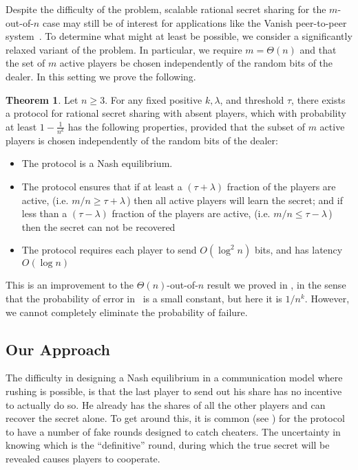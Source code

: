 \documentclass[12pt]{article}
\theoremstyle{definition}
\newtheorem{theorem}{Theorem}
\begin{document}
Despite the difficulty of the problem, scalable rational secret
sharing for the $m$-out-of-$n$ case may still be of interest for
applications like the Vanish peer-to-peer
system~\cite{geambasu2009vanish}.  To determine what might at least be
possible, we consider a significantly relaxed variant of the problem.
In particular, we require $m = \Theta(n)$ and that the set of $m$
active players be chosen independently of the random bits of the
dealer.  In this setting we prove the following.

\begin{theorem}
Let $n \geq 3$.  For any fixed positive $k, \lambda$, and threshold
$\tau$, there exists a protocol for rational secret sharing with
absent players, which with probability at least $1-\frac1{n^k}$ has
the following properties, provided that the subset of $m$ active
players is chosen independently of the random bits of the dealer:
\begin{itemize}
\item The protocol is a Nash equilibrium.
\item The protocol ensures that if at least a $(\tau + \lambda)$
  fraction of the players are active, (i.e. $m/n \ge \tau +
  \lambda$\,) then all active players will learn the secret; and if
  less than a $(\tau - \lambda)$ fraction of the players are active,
  (i.e. $m/n \le \tau -\lambda$\,) then the secret can not be
  recovered
\item The protocol requires each player to send $O(\log^2 n)$ bits,
  and has latency $O(\log n)$
\end{itemize}
\label{thm:mofn}
\end{theorem}

This is an improvement to the $\Theta(n)$-out-of-$n$ result we proved
in \cite{RSSpodc11}, in the sense that the probability of error
in~\cite{RSSpodc11} is a small constant, but here it is $1/n^{k}$.
However, we cannot completely eliminate the probability of failure.

\subsection{Our Approach}

The difficulty in designing a Nash equilibrium in a communication
model where rushing is possible, is that the last player to send out
his share has no incentive to actually do so.  He already has the
shares of all the other players and can recover the secret alone. To
get around this, it is common (see \cite{halpern2004rational,
  abraham2006distributed, gordon2006rational,
  lysyanskaya2006rationality, kol2008games}) for the protocol to have
a number of fake rounds designed to catch cheaters. The uncertainty in
knowing which is the ``definitive'' round, during which the true
secret will be revealed causes players to cooperate.
\end{document}
